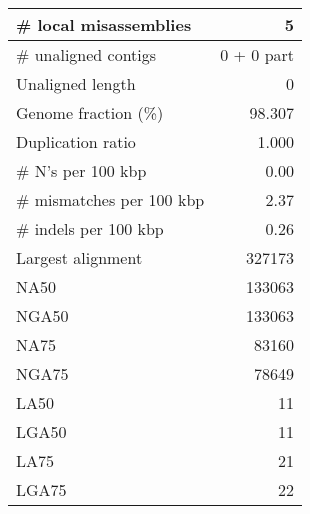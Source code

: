 \documentclass[12pt,a4paper]{article}
\begin{document}
\begin{table}[ht]
\begin{center}
\begin{tabular}{|l*{1}{|r}|}
\# local misassemblies & 5 \\ \hline
\# unaligned contigs & 0 + 0 part \\ \hline
Unaligned length & 0 \\ \hline
Genome fraction (\%) & 98.307 \\ \hline
Duplication ratio & 1.000 \\ \hline
\# N's per 100 kbp & 0.00 \\ \hline
\# mismatches per 100 kbp & 2.37 \\ \hline
\# indels per 100 kbp & 0.26 \\ \hline
Largest alignment & 327173 \\ \hline
NA50 & 133063 \\ \hline
NGA50 & 133063 \\ \hline
NA75 & 83160 \\ \hline
NGA75 & 78649 \\ \hline
LA50 & 11 \\ \hline
LGA50 & 11 \\ \hline
LA75 & 21 \\ \hline
LGA75 & 22 \\ \hline
\end{tabular}
\end{center}
\end{table}
\end{document}
